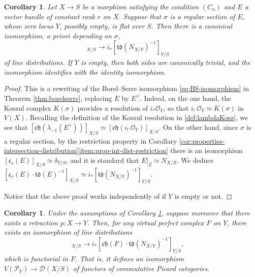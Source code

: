 \documentclass[JEP,XML,SOM,Unicode,published]{cedram}
\theoremstyle{plain}
\newtheorem{corollary}[theorem]{Corollary}
\theoremstyle{definition}
\newcommand{\Dcal}{\mathcal D}
\newcommand{\Ocal}{\mathcal O}
\newcommand{\Pcal}{\mathcal P}
\newcommand{\cfrak}{\mathfrak c}
\newcommand{\chfrak}{\mathfrak {ch}}
\newcommand{\tdfrak}{\mathfrak {td}}
\begin{document}
\begin{corollary}\label{cor:Borel-Serre-consequence}
Let $X\to S$ be a morphism satisfying the condition $(C_n)$ and $E$ a vector bundle of constant rank $r$ on $X$. Suppose that $\sigma$ is a regular section of $E$, whose zero locus $Y$, possibly empty, is flat over $S$. Then there is a canonical isomorphism, a priori depending on $\sigma$,\vspace*{-3pt}
\begin{displaymath}
[\chfrak(i_! \ \Ocal_Y)]_{X/S} \to i_\ast [\tdfrak(N_{X/Y})^{-1}]_{Y/S}
\end{displaymath}
of line distributions. If $Y$ is empty, then both sides are canonically trivial, and the isomorphism identifies with the identity isomorphism.

\end{corollary}

\begin{proof}
This is a rewriting of the Borel--Serre isomorphism \eqref{eq:BS-isomorphism} in Theorem \ref{thm:borelserre}, replacing $E$ by $E^\vee$. Indeed, on the one hand, the Koszul complex $K(\sigma)$ provides a resolution of $i_{\ast}\Ocal_{Y}$, so that $i_{!}\ \Ocal_{Y}\simeq K(\sigma)$ in $V(X)$. Recalling the definition of the Koszul resolution in \eqref{def:lambdaKosz}, we see that $[\chfrak(\lambda_{-1}(E^{\vee}))]_{X/S}\simeq [\chfrak(i_{!}\ \Ocal_{Y})]_{X/S}$. On the other hand, since $\sigma$ is a regular section, by the restriction property in Corollary \ref{cor:properties-intersection-distribution}\eqref{item:prop-int-dist-restriction} there is an isomorphism $[\cfrak_r(E)]_{X/S} \simeq \delta_{Y/S}$, and it is standard that $E|_{Z} \simeq N_{X/Z}$. We deduce $[\cfrak_{r}(E)\cdot\tdfrak(E)^{-1}]_{X/S}\simeq i_{\ast}[\tdfrak(N_{X/Y})^{-1}]_{Y/S}$.

Notice that the above proof works independently of if $Y$ is empty or not.
\end{proof}

\begin{corollary}\label{cor:Borel-Serre-consequence2}
Under the assumptions of Corollary \ref{cor:Borel-Serre-consequence}, suppose moreover that there exists a retraction $p\colon X\to Y$. Then, for any virtual perfect complex $F$ on $Y$, there exists an isomorphism of line distributions\vspace*{-3pt}
\begin{displaymath}
[\chfrak(i_!\ F)]_{X/S} \to i_\ast [\chfrak(F) \cdot \tdfrak(N_{X/Y})^{-1}]_{Y/S},
\end{displaymath}
which is functorial in $F$. That is, it defines an isomorphism $V(\Pcal_{Y})\to\Dcal(X/S)$ of functors of commutative Picard categories.
\end{corollary}
\end{document}
